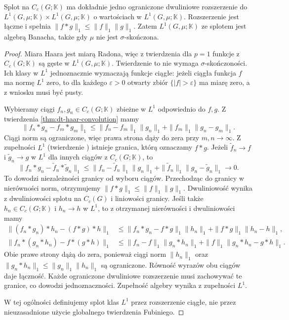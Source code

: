 \begin{twierdzenie}
\label{thm:dt-haar-l1-convolution}
Splot na $C_c(G;\mathbb K)$ ma dokładnie jedno
ograniczone dwuliniowe rozszerzenie do
$L^1(G,\mu;\mathbb K)\times L^1(G,\mu;\mathbb K)$
o wartościach w $L^1(G,\mu;\mathbb K)$.
Rozszerzenie jest łączne i spełnia
$\|f*g\|_1\le\|f\|_1\|g\|_1$.
Zatem $L^1(G,\mu;\mathbb K)$ ze splotem jest
algebrą Banacha, także gdy $\mu$ nie jest
$\sigma$-skończona.
\end{twierdzenie}
\begin{proof}
Miara Haara jest miarą Radona, więc z twierdzenia
 dla $p=1$ funkcje
z $C_c(G;\mathbb K)$ są gęste w $L^1(G,\mu;\mathbb K)$.
Twierdzenie to nie wymaga $\sigma$-skończoności. Ich klasy w $L^1$
jednoznacznie wyznaczają funkcje ciągłe:
jeżeli ciągła funkcja $f$ ma normę $L^1$ zero,
to dla każdego $\varepsilon>0$ otwarty zbiór
$\{|f|>\varepsilon\}$ ma miarę zero, a z wniosku
 musi być pusty.

Wybieramy ciągi $f_n,g_n\in C_c(G;\mathbb K)$
zbieżne w $L^1$ odpowiednio do $f,g$.
Z twierdzenia \ref{thm:dt-haar-convolution}
mamy
\[
 \|f_n*g_n-f_m*g_m\|_1
 \le\|f_n-f_m\|_1\|g_n\|_1+
    \|f_m\|_1\|g_n-g_m\|_1.
\]
Ciągi norm są ograniczone, więc prawa strona
dąży do zera przy $m,n\to\infty$. Z zupełności
$L^1$ (twierdzenie )
istnieje granica, którą oznaczamy $f*g$.
Jeżeli $\widetilde f_n\to f$ i $\widetilde g_n\to g$
w $L^1$ dla innych ciągów z $C_c(G;\mathbb K)$, to
\[
 \|f_n*g_n-\widetilde f_n*\widetilde g_n\|_1
 \le \|f_n-\widetilde f_n\|_1\|g_n\|_1
   +\|\widetilde f_n\|_1\|g_n-\widetilde g_n\|_1
 \longrightarrow0.
\]
To dowodzi niezależności granicy od wyboru ciągów. Przechodząc do granicy
w nierówności norm, otrzymujemy
$\|f*g\|_1\le\|f\|_1\|g\|_1$.
Dwuliniowość wynika z dwuliniowości splotu
na $C_c(G)$ i liniowości granicy.
Jeśli także $h_n\in C_c(G;\mathbb K)$ i $h_n\to h$ w $L^1$,
to z otrzymanej nierówności i dwuliniowości mamy
\begin{align*}
 \|(f_n*g_n)*h_n-(f*g)*h\|_1
 &\le\|f_n*g_n-f*g\|_1\|h_n\|_1
   +\|f*g\|_1\|h_n-h\|_1,\\
 \|f_n*(g_n*h_n)-f*(g*h)\|_1
 &\le\|f_n-f\|_1\|g_n*h_n\|_1
   +\|f\|_1\|g_n*h_n-g*h\|_1.
\end{align*}
Obie prawe strony dążą do zera, ponieważ ciągi norm
$\|h_n\|_1$ oraz $\|g_n*h_n\|_1\le\|g_n\|_1\|h_n\|_1$
są ograniczone.
Równość wyrazów obu ciągów daje łączność.
Każde ograniczone dwuliniowe rozszerzenie
musi zachowywać te granice, co dowodzi
jednoznaczności. Zupełność algebry wynika
z zupełności $L^1$.

W tej ogólności definiujemy splot klas $L^1$
przez rozszerzenie ciągłe, nie przez nieuzasadnione
użycie globalnego twierdzenia Fubiniego.
\end{proof}


